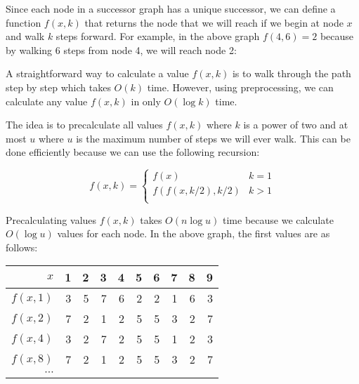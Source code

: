 Since each node in a successor graph has a
unique successor, we can define a function $f(x,k)$
that returns the node that we will reach if
we begin at node $x$ and walk $k$ steps forward.
For example, in the above graph $f(4,6)=2$
because by walking 6 steps from node 4,
we will reach node 2:

\begin{center}
\end{center}

A straightforward way to calculate a value $f(x,k)$
is to walk through the path step by step which takes $O(k)$ time.
However, using preprocessing, we can calculate any
value $f(x,k)$ in only $O(\log k)$ time.

The idea is to precalculate all values $f(x,k)$ where
$k$ is a power of two and at most $u$ where $u$ is
the maximum number of steps we will ever walk.
This can be done efficiently because
we can use the following recursion:

\begin{equation*}
    f(x,k) = \begin{cases}
               f(x)              & k = 1\\
               f(f(x,k/2),k/2)   & k > 1\\
           \end{cases}
\end{equation*}

Precalculating values $f(x,k)$ takes $O(n \log u)$ time
because we calculate $O(\log u)$ values for each node.
In the above graph, the first values are as follows:

\begin{center}
\begin{tabular}{r|rrrrrrrrr}
$x$ & 1 & 2 & 3 & 4 & 5 & 6 & 7 & 8 & 9 \\
\hline
$f(x,1)$ & 3 & 5 & 7 & 6 & 2 & 2 & 1 & 6 & 3 \\
$f(x,2)$ & 7 & 2 & 1 & 2 & 5 & 5 & 3 & 2 & 7 \\
$f(x,4)$ & 3 & 2 & 7 & 2 & 5 & 5 & 1 & 2 & 3 \\
$f(x,8)$ & 7 & 2 & 1 & 2 & 5 & 5 & 3 & 2 & 7 \\
$\cdots$ \\
\end{tabular}
\end{center}

